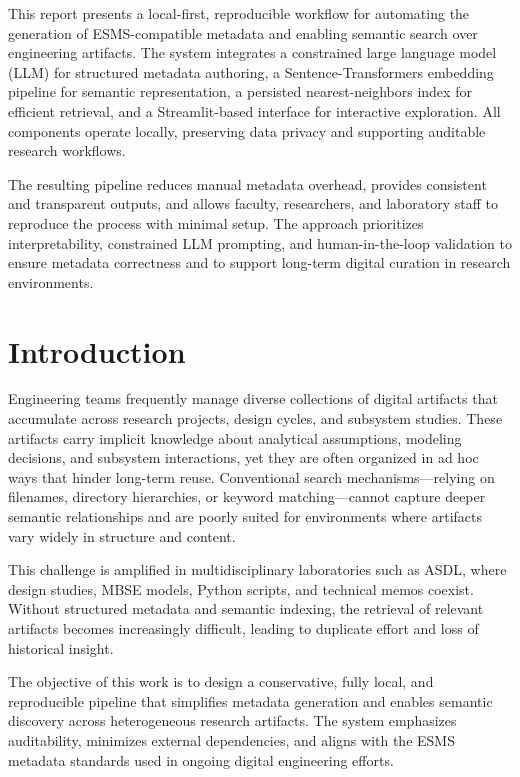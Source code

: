 \documentclass[12pt]{article}
\begin{document}
This report presents a local-first, reproducible workflow for automating the generation of ESMS-compatible metadata and enabling semantic search over engineering artifacts. The system integrates a constrained large language model (LLM) for structured metadata authoring, a Sentence-Transformers embedding pipeline for semantic representation, a persisted nearest-neighbors index for efficient retrieval, and a Streamlit-based interface for interactive exploration. All components operate locally, preserving data privacy and supporting auditable research workflows.

The resulting pipeline reduces manual metadata overhead, provides consistent and transparent outputs, and allows faculty, researchers, and laboratory staff to reproduce the process with minimal setup. The approach prioritizes interpretability, constrained LLM prompting, and human-in-the-loop validation to ensure metadata correctness and to support long-term digital curation in research environments.

\newpage

\section{Introduction}

Engineering teams frequently manage diverse collections of digital artifacts that accumulate across research projects, design cycles, and subsystem studies. These artifacts carry implicit knowledge about analytical assumptions, modeling decisions, and subsystem interactions, yet they are often organized in ad hoc ways that hinder long-term reuse. Conventional search mechanisms—relying on filenames, directory hierarchies, or keyword matching—cannot capture deeper semantic relationships and are poorly suited for environments where artifacts vary widely in structure and content.

This challenge is amplified in multidisciplinary laboratories such as ASDL, where design studies, MBSE models, Python scripts, and technical memos coexist. Without structured metadata and semantic indexing, the retrieval of relevant artifacts becomes increasingly difficult, leading to duplicate effort and loss of historical insight.

The objective of this work is to design a conservative, fully local, and reproducible pipeline that simplifies metadata generation and enables semantic discovery across heterogeneous research artifacts. The system emphasizes auditability, minimizes external dependencies, and aligns with the ESMS metadata standards used in ongoing digital engineering efforts.
\end{document}
